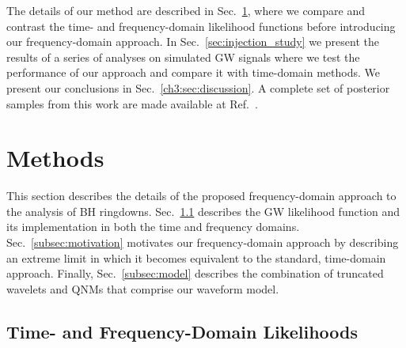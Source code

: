 The details of our method are described in Sec.~\ref{sec:methods}, where we compare and contrast the time- and frequency-domain likelihood functions before introducing our frequency-domain approach.
In Sec.~\ref{sec:injection_study} we present the results of a series of analyses on simulated GW signals where we test the performance of our approach and compare it with time-domain methods.
We present our conclusions in Sec.~\ref{ch3:sec:discussion}.
A complete set of posterior samples from this work are made available at Ref.~\cite{finch_eliot_2021_5569759}.


\section{Methods}\label{sec:methods}

This section describes the details of the proposed frequency-domain approach to the analysis of BH ringdowns. 
Sec.~\ref{subsec:data_analysis} describes the GW likelihood function and its implementation in both the time and frequency domains.
Sec.~\ref{subsec:motivation} motivates our frequency-domain approach by describing an extreme limit in which it becomes equivalent to the standard, time-domain approach.
Finally, Sec.~\ref{subsec:model} describes the combination of truncated wavelets and QNMs that comprise our waveform model.


\subsection{Time- and Frequency-Domain Likelihoods}\label{subsec:data_analysis}

